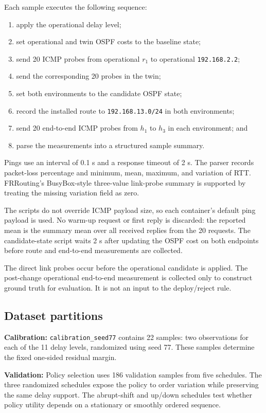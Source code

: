 Each sample executes the following sequence:
\begin{enumerate}
\item apply the operational delay level;
\item set operational and twin OSPF costs to the baseline state;
\item send 20 ICMP probes from operational $r_1$ to operational \texttt{192.168.2.2};
\item send the corresponding 20 probes in the twin;
\item set both environments to the candidate OSPF state;
\item record the installed route to \texttt{192.168.13.0/24} in both environments;
\item send 20 end-to-end ICMP probes from $h_1$ to $h_3$ in each environment; and
\item parse the measurements into a structured sample summary.
\end{enumerate}

Pings use an interval of 0.1 s and a response timeout of 2 s. The parser records packet-loss percentage and minimum, mean, maximum, and variation of RTT. FRRouting's BusyBox-style three-value link-probe summary is supported by treating the missing variation field as zero.

The scripts do not override ICMP payload size, so each container's default ping payload is used. No warm-up request or first reply is discarded: the reported mean is the summary mean over all received replies from the 20 requests. The candidate-state script waits 2 s after updating the OSPF cost on both endpoints before route and end-to-end measurements are collected.

The direct link probes occur before the operational candidate is applied. The post-change operational end-to-end measurement is collected only to construct ground truth for evaluation. It is not an input to the deploy/reject rule.

\subsection{Dataset partitions}

\textbf{Calibration:} \texttt{calibration\_seed77} contains 22 samples: two observations for each of the 11 delay levels, randomized using seed 77. These samples determine the fixed one-sided residual margin.

\textbf{Validation:} Policy selection uses 186 validation samples from five schedules. The three randomized schedules expose the policy to order variation while preserving the same delay support. The abrupt-shift and up/down schedules test whether policy utility depends on a stationary or smoothly ordered sequence.

